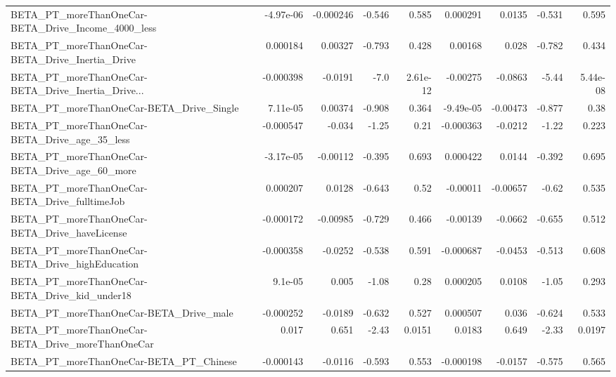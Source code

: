 \begin{tabular}{lrrrrrrrr}
BETA\_PT\_moreThanOneCar-BETA\_Drive\_Income\_4000\_less &   -4.97e-06 &    -0.000246 &   -0.546 &    0.585 &   0.000291 &      0.0135 &       -0.531 &         0.595 \\
BETA\_PT\_moreThanOneCar-BETA\_Drive\_Inertia\_Drive    &    0.000184 &      0.00327 &   -0.793 &    0.428 &    0.00168 &       0.028 &       -0.782 &         0.434 \\
BETA\_PT\_moreThanOneCar-BETA\_Drive\_Inertia\_Drive... &   -0.000398 &      -0.0191 &     -7.0 & 2.61e-12 &   -0.00275 &     -0.0863 &        -5.44 &      5.44e-08 \\
BETA\_PT\_moreThanOneCar-BETA\_Drive\_Single           &    7.11e-05 &      0.00374 &   -0.908 &    0.364 &  -9.49e-05 &    -0.00473 &       -0.877 &          0.38 \\
BETA\_PT\_moreThanOneCar-BETA\_Drive\_age\_35\_less      &   -0.000547 &       -0.034 &    -1.25 &     0.21 &  -0.000363 &     -0.0212 &        -1.22 &         0.223 \\
BETA\_PT\_moreThanOneCar-BETA\_Drive\_age\_60\_more      &   -3.17e-05 &     -0.00112 &   -0.395 &    0.693 &   0.000422 &      0.0144 &       -0.392 &         0.695 \\
BETA\_PT\_moreThanOneCar-BETA\_Drive\_fulltimeJob      &    0.000207 &       0.0128 &   -0.643 &     0.52 &   -0.00011 &    -0.00657 &        -0.62 &         0.535 \\
BETA\_PT\_moreThanOneCar-BETA\_Drive\_haveLicense      &   -0.000172 &     -0.00985 &   -0.729 &    0.466 &   -0.00139 &     -0.0662 &       -0.655 &         0.512 \\
BETA\_PT\_moreThanOneCar-BETA\_Drive\_highEducation    &   -0.000358 &      -0.0252 &   -0.538 &    0.591 &  -0.000687 &     -0.0453 &       -0.513 &         0.608 \\
BETA\_PT\_moreThanOneCar-BETA\_Drive\_kid\_under18      &     9.1e-05 &        0.005 &    -1.08 &     0.28 &   0.000205 &      0.0108 &        -1.05 &         0.293 \\
BETA\_PT\_moreThanOneCar-BETA\_Drive\_male             &   -0.000252 &      -0.0189 &   -0.632 &    0.527 &   0.000507 &       0.036 &       -0.624 &         0.533 \\
BETA\_PT\_moreThanOneCar-BETA\_Drive\_moreThanOneCar   &       0.017 &        0.651 &    -2.43 &   0.0151 &     0.0183 &       0.649 &        -2.33 &        0.0197 \\
BETA\_PT\_moreThanOneCar-BETA\_PT\_Chinese             &   -0.000143 &      -0.0116 &   -0.593 &    0.553 &  -0.000198 &     -0.0157 &       -0.575 &         0.565 \\

\end{tabular}
